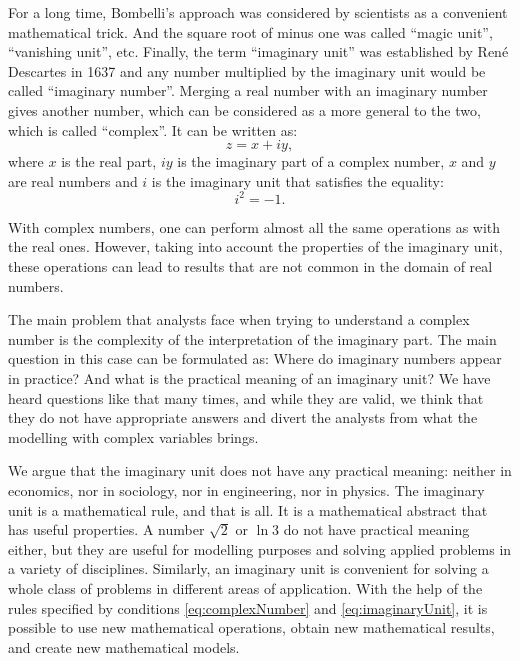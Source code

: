 \documentclass[
]{book}
\begin{document}
For a long time, Bombelli's approach was considered by scientists as a convenient mathematical trick. And the square root of minus one was called ``magic unit'', ``vanishing unit'', etc. Finally, the term ``imaginary unit'' was established by René Descartes in 1637 and any number multiplied by the imaginary unit would be called ``imaginary number''. Merging a real number with an imaginary number gives another number, which can be considered as a more general to the two, which is called ``complex''. It can be written as:
\begin{equation}
    z = x+iy ,
    \label{eq:complexNumber}
\end{equation}
where \(x\) is the real part, \(iy\) is the imaginary part of a complex number, \(x\) and \(y\) are real numbers and \(i\) is the imaginary unit that satisfies the equality:
\begin{equation}
    i^2 = -1 .
    \label{eq:imaginaryUnit}
\end{equation}

With complex numbers, one can perform almost all the same operations as with the real ones. However, taking into account the properties of the imaginary unit, these operations can lead to results that are not common in the domain of real numbers.

The main problem that analysts face when trying to understand a complex number is the complexity of the interpretation of the imaginary part. The main question in this case can be formulated as: Where do imaginary numbers appear in practice? And what is the practical meaning of an imaginary unit? We have heard questions like that many times, and while they are valid, we think that they do not have appropriate answers and divert the analysts from what the modelling with complex variables brings.

We argue that the imaginary unit does not have any practical meaning: neither in economics, nor in sociology, nor in engineering, nor in physics. The imaginary unit is a mathematical rule, and that is all. It is a mathematical abstract that has useful properties. A number \(\sqrt{2}\) or \(\ln 3\) do not have practical meaning either, but they are useful for modelling purposes and solving applied problems in a variety of disciplines. Similarly, an imaginary unit is convenient for solving a whole class of problems in different areas of application. With the help of the rules specified by conditions \eqref{eq:complexNumber} and \eqref{eq:imaginaryUnit}, it is possible to use new mathematical operations, obtain new mathematical results, and create new mathematical models.
\end{document}
